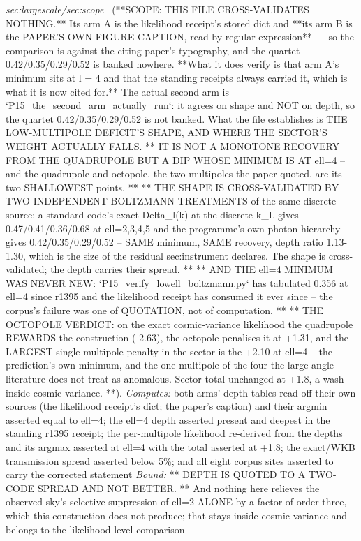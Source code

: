 \begin{description}
\textit{sec:largescale/sec:scope} \ (**SCOPE: THIS FILE CROSS-VALIDATES NOTHING.** Its arm A is the likelihood receipt's stored dict and **its arm B is the PAPER'S OWN FIGURE CAPTION, read by regular expression** --- so the comparison is against the citing paper's typography, and the quartet 0.42/0.35/0.29/0.52 is banked nowhere. **What it does verify is that arm A's minimum sits at l = 4 and that the standing receipts always carried it, which is what it is now cited for.** The actual second arm is `P15\_the\_second\_arm\_actually\_run`: it agrees on shape and NOT on depth, so the quartet 0.42/0.35/0.29/0.52 is not banked. What the file establishes is THE LOW-MULTIPOLE DEFICIT'S SHAPE, AND WHERE THE SECTOR'S WEIGHT ACTUALLY FALLS. ** IT IS NOT A MONOTONE RECOVERY FROM THE QUADRUPOLE BUT A DIP WHOSE MINIMUM IS AT ell=4 -- and the quadrupole and octopole, the two multipoles the paper quoted, are its two SHALLOWEST points. ** ** THE SHAPE IS CROSS-VALIDATED BY TWO INDEPENDENT BOLTZMANN TREATMENTS of the same discrete source: a standard code's exact Delta\_l(k) at the discrete k\_L gives 0.47/0.41/0.36/0.68 at ell=2,3,4,5 and the programme's own photon hierarchy gives 0.42/0.35/0.29/0.52 -- SAME minimum, SAME recovery, depth ratio 1.13-1.30, which is the size of the residual sec:instrument declares. The shape is cross-validated; the depth carries their spread. ** ** AND THE ell=4 MINIMUM WAS NEVER NEW: `P15\_verify\_lowell\_boltzmann.py` has tabulated 0.356 at ell=4 since r1395 and the likelihood receipt has consumed it ever since -- the corpus's failure was one of QUOTATION, not of computation. ** ** THE OCTOPOLE VERDICT: on the exact cosmic-variance likelihood the quadrupole REWARDS the construction (-2.63), the octopole penalises it at +1.31, and the LARGEST single-multipole penalty in the sector is the +2.10 at ell=4 -- the prediction's own minimum, and the one multipole of the four the large-angle literature does not treat as anomalous. Sector total unchanged at +1.8, a wash inside cosmic variance. **). 
\emph{Computes:} both arms' depth tables read off their own sources (the likelihood receipt's dict; the paper's caption) and their argmin asserted equal to ell=4; the ell=4 depth asserted present and deepest in the standing r1395 receipt; the per-multipole likelihood re-derived from the depths and its argmax asserted at ell=4 with the total asserted at +1.8; the exact/WKB transmission spread asserted below 5\%; and all eight corpus sites asserted to carry the corrected statement
 \emph{Bound:} ** DEPTH IS QUOTED TO A TWO-CODE SPREAD AND NOT BETTER. ** And nothing here relieves the observed sky's selective suppression of ell=2 ALONE by a factor of order three, which this construction does not produce; that stays inside cosmic variance and belongs to the likelihood-level comparison

\end{description}
